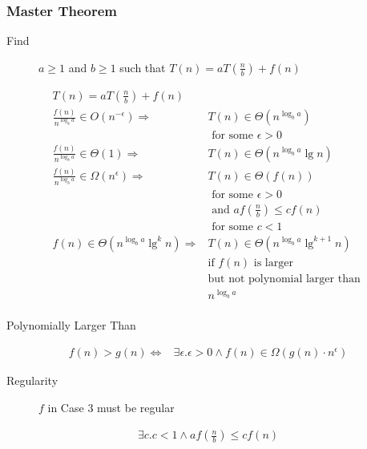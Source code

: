 \documentclass[10pt, a4paper,landscape]{article}
\begin{document}
\begin{multicols*}{4}
\subsubsection{Master Theorem}
\begin{description}
    \item[Find] $a \geq 1$ and $b \geq 1$ such that $T(n) = a T\left(\frac n b\right) + f(n)$
\end{description}
\begin{align*}
    T(n) = a T\left(\frac n b\right) + f(n) \\
    \frac{f(n)}{n^{\log_b a}} \in O(n^{-\epsilon})  \Rightarrow& T(n) \in \Theta(n^{\log_b a})\\ &\text{ for some } \epsilon > 0 \\
    \frac{f(n)}{n^{\log_b a}} \in \Theta(1) \Rightarrow& T(n) \in \Theta(n^{\log_b a} \lg n) \\
    \frac{f(n)}{n^{\log_b a}} \in \Omega(n^{\epsilon}) \Rightarrow& T(n) \in \Theta(f(n))\\ &\text{ for some } \epsilon > 0 \\&\text{ and } af(\frac{n}{b}) \leq cf(n)\\ &\text{ for some } c < 1 \\
    f(n) \in \Theta(n^{\log_b a} \lg^{k} n) \Rightarrow& T(n) \in \Theta(n^{\log_b a} \lg^{k + 1} n)\\ &\text{if } f(n) \text{ is larger}\\ &\text{but not polynomial larger than }\\ &n^{\log_b a}\\
\end{align*}

\begin{description}
    \item[Polynomially Larger Than]
\end{description}
\begin{align*}
    f(n) > g(n) \Leftrightarrow& \exists \epsilon. \epsilon > 0 \land f(n) \in \Omega(g(n) \cdot n^\epsilon)
\end{align*}

\begin{description}
    \item[Regularity] $f$ in Case 3 must be regular
\end{description}
\begin{align*}
    \exists c. c < 1 \land af\left(\frac n b\right) \leq cf(n)\\
\end{align*}


\end{multicols*}
\end{document}
